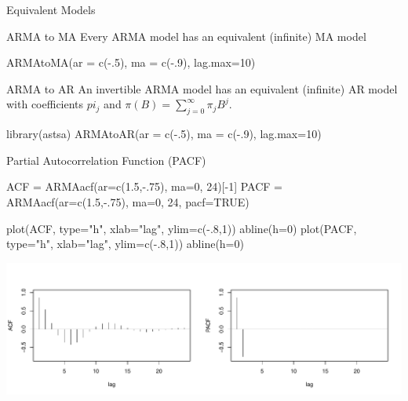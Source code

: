 \documentclass[ignorenonframetext,xcolor=x11names]{beamer}
\begin{document}

\begin{frame}[fragile]{Equivalent Models}
\begin{block}{ARMA to MA}
Every ARMA model has an equivalent (infinite) MA model
\begin{Rcode}
ARMAtoMA(ar = c(-.5), ma = c(-.9), lag.max=10)
\end{Rcode}
\end{block}

\begin{block}{ARMA to AR}
An invertible ARMA model has an equivalent (infinite) AR model with coefficients $pi_j$ and $\pi (B) = \sum_{j=0}^\infty \pi_j B^j$.
\begin{Rcode}
library(astsa)
ARMAtoAR(ar = c(-.5), ma = c(-.9), lag.max=10)
\end{Rcode}
\end{block}
\end{frame}


\begin{frame}[fragile]{Partial Autocorrelation Function (PACF)}
\begin{Rcode}
ACF = ARMAacf(ar=c(1.5,-.75), ma=0, 24)[-1]
PACF = ARMAacf(ar=c(1.5,-.75), ma=0, 24, pacf=TRUE)

plot(ACF, type="h", xlab="lag", ylim=c(-.8,1))
abline(h=0)
plot(PACF, type="h", xlab="lag", ylim=c(-.8,1))
abline(h=0)
\end{Rcode}
\vspace{-2\baselineskip}
\begin{center}
\includegraphics[width=\textwidth]{figure20.pdf}
\end{center}
\end{frame}
\end{document}
